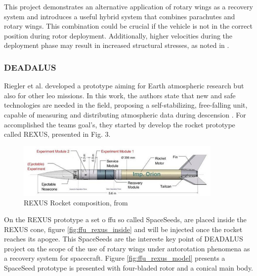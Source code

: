 This project \cite{maurer_project_nodate} demonstrates an alternative application of rotary wings as a recovery system and introduces a useful hybrid system that combines parachutes and rotary wings. This combination could be crucial if the vehicle is not in the correct position during rotor deployment. Additionally, higher velocities during the deployment phase may result in increased structural stresses, as noted in \cite{noauthor_armada_nodate}.

\subsubsection{DEADALUS}

Riegler et al. developed a prototype \cite{riegler_daedalus_2018} aiming for Earth atmospheric research but also for other \gls{leo} missions. In this work, the authors state that new and safe technologies are needed in the field, proposing a self-stabilizing, free-falling unit, capable of measuring and distributing atmospheric data during descension \cite{riegler_daedalus_2018}. For accomplished the teams goal's, they started by develop the rocket prototype called REXUS, presented in Fig. 3. 


\begin{figure}[!htb]
    \centering
    \includegraphics[width=10cm]{Figures/introduction/REXUS-Rocket-composition_W640.jpg}
    \caption{REXUS Rocket composition, from \cite{riegler_daedalus_2018}}
    \label{fig:rexus_rocket}
\end{figure}

On the REXUS prototype \cite{riegler_daedalus_2018} a set o  \gls{ffu} so called SpaceSeeds, are placed inside the REXUS cone, figure \ref{fig:ffu_rexus_inside} and will be injected once the rocket reaches its apogee. This SpaceSeeds are the intereste key point of DEADALUS project on the scope of the use of rotary wings under autorotation phenomena as a recovery system for spacecraft. Figure \ref{fig:ffu_rexus_model} presents a SpaceSeed prototype is presented with four-bladed rotor and a conical main body.



